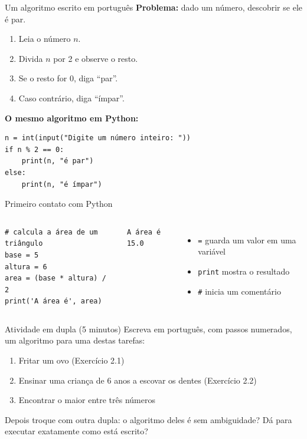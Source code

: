 \documentclass[aspectratio=169,10pt,t]{beamer}
\begin{document}
\begin{frame}[fragile]{Um algoritmo escrito em português}
  \textbf{Problema:} dado um número, descobrir se ele é par.
  \begin{enumerate}
    \item Leia o número \(n\).
    \item Divida \(n\) por 2 e observe o resto.
    \item Se o resto for 0, diga ``par''.
    \item Caso contrário, diga ``ímpar''.
  \end{enumerate}
  \vspace{1ex}
  \textbf{O mesmo algoritmo em Python:}
\begin{lstlisting}
n = int(input("Digite um número inteiro: "))
if n % 2 == 0:
    print(n, "é par")
else:
    print(n, "é ímpar")
\end{lstlisting}
\end{frame}

\begin{frame}[fragile]{Primeiro contato com Python}
  \begin{columns}[T]
\begin{lstlisting}
# calcula a área de um triângulo
base = 5
altura = 6
area = (base * altura) / 2
print('A área é', area)
\end{lstlisting}
\begin{lstlisting}[style=saida]
A área é 15.0
\end{lstlisting}
    \vspace{1ex}
    \begin{itemize}
      \item \texttt{=} guarda um valor em uma variável
      \item \texttt{print} mostra o resultado
      \item \texttt{\#} inicia um comentário
    \end{itemize}
  \end{columns}
  \vfill{}
\end{frame}

\begin{frame}{Atividade em dupla (5 minutos)}
  Escreva em português, com passos numerados, um algoritmo para uma destas tarefas:
  \begin{enumerate}
    \item Fritar um ovo \hfill {\footnotesize (Exercício 2.1)}
    \item Ensinar uma criança de 6 anos a escovar os dentes \hfill {\footnotesize (Exercício 2.2)}
    \item Encontrar o maior entre três números
  \end{enumerate}
  \vspace{1ex}
  Depois troque com outra dupla: o algoritmo deles é \alert{sem ambiguidade}? Dá para executar exatamente como está escrito?
\end{frame}
\end{document}
